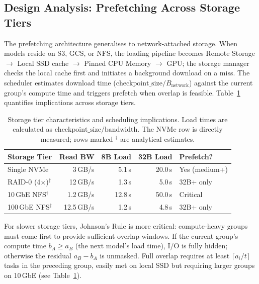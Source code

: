 \documentclass[logo,bsc,singlespacing,parskip,online]{infthesis}
\begin{document}
\subsection{Design Analysis: Prefetching Across Storage Tiers}
\label{sec:prefetch_storage_tiers}

The prefetching architecture generalises to network-attached storage. When models reside on S3, GCS, or NFS, the loading pipeline becomes Remote Storage $\to$ Local SSD cache $\to$ Pinned CPU Memory $\to$ GPU; the storage manager checks the local cache first and initiates a background download on a miss. The scheduler estimates download time ($\text{checkpoint\_size} / B_{\text{network}}$) against the current group's compute time and triggers prefetch when overlap is feasible. Table~\ref{tab:storage_bandwidth} quantifies implications across storage tiers.

\begin{table}[htbp]
\centering
\caption{Storage tier characteristics and scheduling implications. Load times are calculated as $\text{checkpoint\_size} / \text{bandwidth}$. The NVMe row is directly measured; rows marked $^\dagger$ are analytical estimates.}
\label{tab:storage_bandwidth}
\begin{tabular}{lrrrl}
\toprule
Storage Tier & Read BW & 8B Load & 32B Load & Prefetch? \\
\midrule
Single NVMe & 3\,GB/s & 5.1\,s & 20.0\,s & Yes (medium+) \\
RAID-0 (4$\times$)$^\dagger$ & 12\,GB/s & 1.3\,s & 5.0\,s & 32B+ only \\
10\,GbE NFS$^\dagger$ & 1.2\,GB/s & 12.8\,s & 50.0\,s & Critical \\
100\,GbE NFS$^\dagger$ & 12.5\,GB/s & 1.2\,s & 4.8\,s & 32B+ only \\
\bottomrule
\end{tabular}
\end{table}

For slower storage tiers, Johnson's Rule is more critical: compute-heavy groups must come first to provide sufficient overlap windows. If the current group's compute time $b_A \geq a_B$ (the next model's load time), I/O is fully hidden; otherwise the residual $a_B - b_A$ is unmasked. Full overlap requires at least $\lceil a_i / t \rceil$ tasks in the preceding group, easily met on local SSD but requiring larger groups on 10\,GbE (see Table~\ref{tab:storage_bandwidth}).



\end{document}
